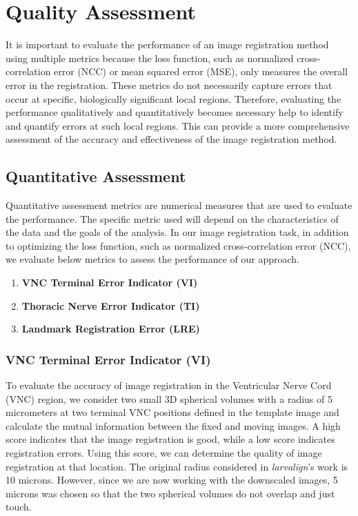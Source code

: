 \documentclass{report}
\begin{document}
	\section{Quality Assessment}\label{sec:quality}
	It is important to evaluate the performance of an image registration method using multiple metrics because the loss function, such as normalized cross-correlation error (NCC) or mean squared error (MSE), only measures the overall error in the registration. These metrics do not necessarily capture errors that occur at specific, biologically significant local regions. Therefore, evaluating the performance qualitatively and quantitatively becomes necessary help to identify and quantify errors at such local regions. This can provide a more comprehensive assessment of the accuracy and effectiveness of the image registration method.
	
	\subsection{Quantitative Assessment}
	Quantitative assessment metrics are numerical measures that are used to evaluate the performance. The specific metric used will depend on the characteristics of the data and the goals of the analysis. In our image registration task, in addition to optimizing the loss function, such as normalized cross-correlation error (NCC), we  evaluate below metrics to assess the performance of our approach.
	\begin{enumerate}
		\item \textbf{VNC Terminal Error Indicator (VI)}
		\item \textbf{Thoracic Nerve Error Indicator (TI)}
		\item \textbf{Landmark Registration Error (LRE)}
	\end{enumerate}

	\subsubsection{VNC Terminal Error Indicator (VI)}
	To evaluate the accuracy of image registration in the Ventricular Nerve Cord (VNC) region, we consider two small 3D spherical volumes with a radius of 5 micrometers at two terminal VNC positions defined in the template image and calculate the mutual information between the fixed and moving images. A high score indicates that the image registration is good, while a low score indicates registration errors. Using this score, we can determine the quality of image registration at that location.
	The original radius considered in \textit{larvalign}'s work \cite{larvalign} is 10 microns. However, since we are now working with the downscaled images, 5 microns was chosen so that the two spherical volumes do not overlap and just touch.
	
\end{document}
